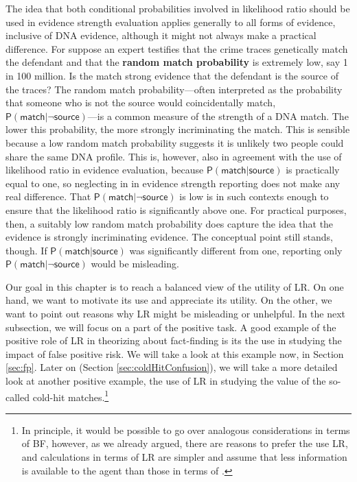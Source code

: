 \documentclass[
  10pt,
  dvipsnames,enabledeprecatedfontcommands]{scrartcl}
\newcommand{\pr}[1]{\mathsf{P}(#1)}
\begin{document}
The idea that both conditional probabilities involved in likelihood
ratio should be used in evidence strength evaluation applies generally
to all forms of evidence, inclusive of DNA evidence, although it might
not always make a practical difference. For suppose an expert testifies
that the crime traces genetically match the defendant and that the
\textbf{random match probability} is extremely low, say 1 in 100
million. Is the match strong evidence that the defendant is the source
of the traces? The random match probability---often interpreted as the
probability that someone who is not the source would coincidentally
match, \(\pr{\textsf{match} \vert \neg \textsf{source}}\)---is a common
measure of the strength of a DNA match. The lower this probability, the
more strongly incriminating the match. This is sensible because a low
random match probability suggests it is unlikely two people could share
the same DNA profile. This is, however, also in agreement with the use
of likelihood ratio in evidence evaluation, because
\(\pr{\textsf{match} \vert \textsf{source}}\) is practically equal to
one, so neglecting in in evidence strength reporting does not make any
real difference. That \(\pr{\textsf{match} \vert \neg \textsf{source}}\)
is low is in such contexts enough to ensure that the likelihood ratio is
significantly above one. For practical purposes, then, a suitably low
random match probability does capture the idea that the evidence is
strongly incriminating evidence. The conceptual point still stands,
though. If \(\pr{\textsf{match} \vert \textsf{source}}\) was
significantly different from one, reporting only
\(\pr{\textsf{match} \vert \neg \textsf{source}}\) would be misleading.

Our goal in this chapter is to reach a balanced view of the utility of
\textsf{LR}. On one hand, we want to motivate its use and appreciate its
utility. On the other, we want to point out reasons why \textsf{LR}
might be misleading or unhelpful. In the next subsection, we will focus
on a part of the positive task. A good example of the positive role of
\textsf{LR} in theorizing about fact-finding is its the use in studying
the impact of false positive risk. We will take a look at this example
now, in Section \ref{sec:fp}. Later on (Section
\ref{sec:coldHitConfusion}), we will take a more detailed look at
another positive example, the use of \textsf{LR} in studying the value
of the so-called cold-hit matches.\footnote{In principle, it would be
  possible to go over analogous considerations in terms of \textsf{BF},
  however, as we already argued, there are reasons to prefer the use
  \textsf{LR}, and calculations in terms of \textsf{LR} are simpler and
  assume that less information is available to the agent than those in
  terms of .}
\end{document}
